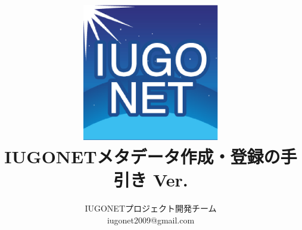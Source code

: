 \documentclass[a4j]{jreport}
\title{\includegraphics[width=6cm]{images/eclipse256.eps}\\IUGONETメタデータ作成・登録の手引き Ver.\thedocversion}
\author{IUGONETプロジェクト開発チーム\\iugonet2009@gmail.com}
\begin{document}
\maketitle
\tableofcontents

\def\currentschema{iugonet-1\_0\_3.xsd}







\appendix


\printindex
\end{document}
